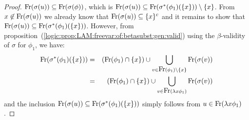 \begin{proof}
    $\mbox{\rm Fr}(\sigma(u))\subseteq\mbox{\rm Fr}(\sigma(\phi))$, which is
    $\mbox{\rm Fr}(\sigma(u))\subseteq\mbox{\rm Fr}(\sigma^{*}(\phi_{1})(\{x\}))\setminus\{x\}$.
    From $x\not\in\mbox{\rm Fr}(\sigma(u))$ we already know that 
    $\mbox{\rm Fr}(\sigma(u))\subseteq\{x\}^{c}$ and it remains to show that
    $\mbox{\rm Fr}(\sigma(u))\subseteq\mbox{\rm Fr}(\sigma^{*}(\phi_{1})(\{x\}))$. However, from 
    proposition~(\ref{logic:prop:LAM:freevar:of:betasubst:gen:valid}) using the 
    $\beta$-validity of $\sigma$ for $\phi_{1}$, we have:
    \begin{eqnarray*}
        \mbox{\rm Fr}(\sigma^{*}(\phi_{1})(\{x\}))
        &=&(\mbox{\rm Fr}(\phi_{1})\cap\{x\})
            \cup
            \bigcup_{v\in\mbox{\rm Fr}(\phi_{1})\setminus\{x\}} \mbox{\rm Fr}(\sigma(v))\\
        &=&(\mbox{\rm Fr}(\phi_{1})\cap\{x\})
            \cup
            \bigcup_{v\in\mbox{\rm Fr}(\lambda x\phi_{1})} \mbox{\rm Fr}(\sigma(v))
    \end{eqnarray*}
    and the inclusion 
    $\mbox{\rm Fr}(\sigma(u))\subseteq\mbox{\rm Fr}(\sigma^{*}(\phi_{1})(\{x\}))$ simply
    follows from $u\in\mbox{\rm Fr}(\lambda x\phi_{1})$.
\end{proof}

